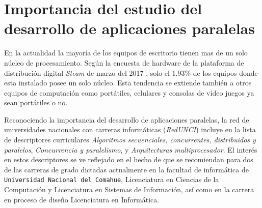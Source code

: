 
\section{Importancia del estudio del desarrollo de aplicaciones paralelas}

En la actualidad la mayoría de los equipos de escritorio tienen mas de un solo
núcleo de procesamiento. Según la encuesta de hardware de la plataforma de
distribución digital \emph{Steam} de marzo del 2017 \cite{steamSurvey}, solo
el $1.93$\% de los equipos donde esta instalado posee un solo núcleo. Esta
tendencia se extiende también a otros equipos de computación como portátiles,
celulares y consolas de vídeo juegos ya sean portátiles o no.

Reconociendo la importancia del desarrollo de aplicaciones paralelas, la red
de universidades nacionales con carreras informáticas (\emph{RedUNCI}) incluye
en la lista de descriptores curriculares \emph{Algoritmos secuenciales,
concurrentes, distribuidos y paralelos}, \emph{Concurrencia y paralelismo}, y
\emph{Arquitecturas multiprocesador}. El interés en estos descriptores se ve
reflejado en el hecho de que se recomiendan para dos de las carreras de grado
dictadas actualmente en la facultad de informática de \texttt{Universidad
Nacional del Comahue}, Licenciatura en Ciencias de la Computación y
Licenciatura en Sistemas de Información, así como en la carrera en proceso de
diseño Licenciatura en Informática.
